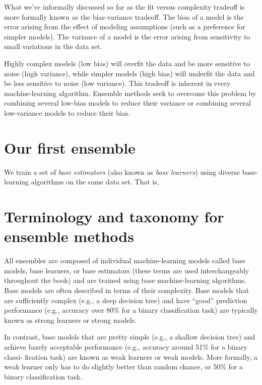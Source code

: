 \begin{tcolorbox}
    What we’ve informally discussed so far as the fit versus complexity tradeoff is more
    formally known as the bias-variance tradeoff. The bias of a model is the error arising
    from the effect of modeling assumptions (such as a preference for simpler models).
    The variance of a model is the error arising from sensitivity to small variations in the
    data set.

    Highly complex models (low bias) will overfit the data and be more sensitive to noise
    (high variance), while simpler models (high bias) will underfit the data and be less
    sensitive to noise (low variance). This tradeoff is inherent in every machine-learning
    algorithm. Ensemble methods seek to overcome this problem by combining several
    low-bias models to reduce their variance or combining several low-variance models to
    reduce their bias.
\end{tcolorbox}
\section{Our first ensemble}
We train a set of \textit{base estimators} (also known as \textit{base learners}) using diverse base-learning algorithms on the same data set. That is, 

\section{Terminology and taxonomy for ensemble methods}
All ensembles are composed of individual machine-learning models called base models,
base learners, or base estimators (these terms are used interchangeably throughout the
book) and are trained using base machine-learning algorithms. Base models are often
described in terms of their complexity. Base models that are sufficiently complex (e.g.,
a deep decision tree) and have “good” prediction performance (e.g., accuracy over
80\% for a binary classification task) are typically known as strong learners or strong models.

In contrast, base models that are pretty simple (e.g., a shallow decision tree) and
achieve barely acceptable performance (e.g., accuracy around 51\% for a binary classi-
fication task) are known as weak learners or weak models. More formally, a weak learner
only has to do slightly better than random chance, or 50\% for a binary classification
task.

